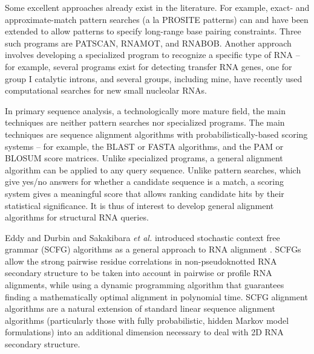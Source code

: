 \documentclass[11pt]{article}
\begin{document}
Some excellent approaches already exist in the literature. For
example, exact- and approximate-match pattern searches (a la PROSITE
patterns) can and have been extended to allow patterns to specify
long-range base pairing constraints. Three such programs are PATSCAN,
RNAMOT, and RNABOB. Another approach involves developing a specialized
program to recognize a specific type of RNA -- for example, several
programs exist for detecting transfer RNA genes, one for group I
catalytic introns, and several groups, including mine, have recently
used computational searches for new small nucleolar RNAs.

In primary sequence analysis, a technologically more mature field, the
main techniques are neither pattern searches nor specialized
programs. The main techniques are sequence alignment algorithms with
probabilistically-based scoring systems -- for example, the BLAST or
FASTA algorithms, and the PAM or BLOSUM score matrices. Unlike
specialized programs, a general alignment algorithm can be applied to
any query sequence. Unlike pattern searches, which give yes/no answers
for whether a candidate sequence is a match, a scoring system gives a
meaningful score that allows ranking candidate hits by their
statistical significance. It is thus of interest to develop general
alignment algorithms for structural RNA queries.

Eddy and Durbin and Sakakibara \emph{et al.} introduced stochastic
context free grammar (SCFG) algorithms as a general approach to RNA
alignment \cite{Eddy94,Sakakibara94c,Durbin98}. SCFGs allow the strong
pairwise residue correlations in non-pseudoknotted RNA secondary
structure to be taken into account in pairwise or profile RNA
alignments, while using a dynamic programming algorithm that
guarantees finding a mathematically optimal alignment in polynomial
time. SCFG alignment algorithms are a natural extension of standard
linear sequence alignment algorithms (particularly those with fully
probabilistic, hidden Markov model formulations) into an additional
dimension necessary to deal with 2D RNA secondary structure.
\end{document}
